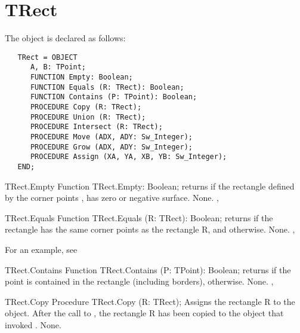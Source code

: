 \section{TRect}
\label{se:TRect}

The  object is declared as follows:
\begin{verbatim}
   TRect = OBJECT
      A, B: TPoint;
      FUNCTION Empty: Boolean;
      FUNCTION Equals (R: TRect): Boolean;
      FUNCTION Contains (P: TPoint): Boolean;
      PROCEDURE Copy (R: TRect);
      PROCEDURE Union (R: TRect);
      PROCEDURE Intersect (R: TRect);
      PROCEDURE Move (ADX, ADY: Sw_Integer);
      PROCEDURE Grow (ADX, ADY: Sw_Integer);
      PROCEDURE Assign (XA, YA, XB, YB: Sw_Integer);
   END;
\end{verbatim}

\begin{function}{TRect.Empty}
\Declaration
Function TRect.Empty: Boolean;
\Description
{} returns  if the rectangle defined by the corner points 
,  has zero or negative surface.
\Errors
None.
\SeeAlso
{}, 
\end{function}

\html{}

\begin{function}{TRect.Equals}      
\Declaration
Function TRect.Equals (R: TRect): Boolean;
\Description
{} returns  if the rectangle has the 
same corner points  as the rectangle R, and 
otherwise.
\Errors
None.
\SeeAlso
{}, 
\end{function}

For an example, see 

\begin{function}{TRect.Contains}
\Declaration
Function TRect.Contains (P: TPoint): Boolean;
\Description
{} returns  if the point  is contained
in the rectangle (including borders),  otherwise.
\Errors
None.
\SeeAlso
{}, 
\end{function}

\begin{procedure}{TRect.Copy}
\Declaration     
Procedure TRect.Copy (R: TRect);
\Description
Assigns the rectangle R to the object. After the call to , the
rectangle R has been copied to the object that invoked .
\Errors
None.
\SeeAlso
{}
\end{procedure}

